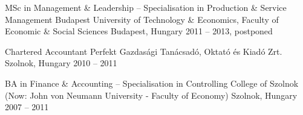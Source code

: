 


\begin{cventries}


  \cventry
    {MSc in Management \& Leadership -- Specialisation in Production \& Service Management} %
    {Budapest University of Technology \& Economics, Faculty of Economic \& Social Sciences} %
    {Budapest, Hungary} %
    {2011 -- 2013, postponed} %
    {} %
    {} %


  \cventry
    {Chartered Accountant} %
    {Perfekt Gazdasági Tanácsadó, Oktató és Kiadó Zrt.} %
    {Szolnok, Hungary} %
    {2010 -- 2011} %
    {} %
    {} %


  \cventry
    {BA in Finance \& Accounting -- Specialisation in Controlling} %
    {College of Szolnok (Now: John von Neumann University - Faculty of Economy)} %
    {Szolnok, Hungary} %
    {2007 -- 2011} %
    {} %
    {} %
    

\end{cventries}
